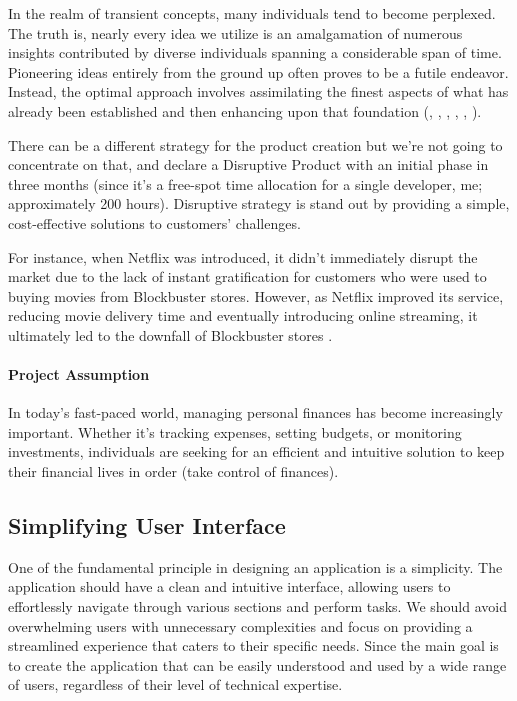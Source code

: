 
In the realm of transient concepts, many individuals tend to become perplexed. The truth is, nearly every idea we 
utilize is an amalgamation of numerous insights contributed by diverse individuals spanning a considerable span of 
time. Pioneering ideas entirely from the ground up often proves to be a futile endeavor. Instead, the optimal approach 
involves assimilating the finest aspects of what has already been established and then enhancing upon that foundation
(\cite{John11}, \cite{Azar22}, \cite{Page19}, \cite{Bara18}, \cite{Kleo12}, \cite{Thag12}).

There can be a different strategy for the product creation \cite{Lomb17} but we're not going to concentrate on that,
and declare a Disruptive Product with an initial phase in three months (since it's a free-spot time allocation
for a single developer, me; approximately 200 hours). Disruptive strategy is stand out by providing a simple, 
cost-effective solutions to customers' challenges. 

For instance, when Netflix was introduced, it didn't immediately disrupt the market due to the lack of instant 
gratification for customers who were used to buying movies from Blockbuster stores. However, as Netflix 
improved its service, reducing movie delivery time and eventually introducing online streaming, it ultimately led 
to the downfall of Blockbuster stores \cite{Eby17}.

\paragraph{Project Assumption} In today's fast-paced world, managing personal finances has become increasingly 
important. Whether it's tracking expenses, setting budgets, or monitoring investments, individuals are seeking for an 
efficient and intuitive solution to keep their financial lives in order (take control of finances).


\subsection{Simplifying User Interface}

One of the fundamental principle in designing an application is a simplicity. The application should have a clean and 
intuitive interface, allowing users to effortlessly navigate through various sections and perform tasks. We should avoid 
overwhelming users with unnecessary complexities and focus on providing a streamlined experience that caters to 
their specific needs. Since the main goal is to create the application that can be easily understood and used by a wide 
range of users, regardless of their level of technical expertise.

